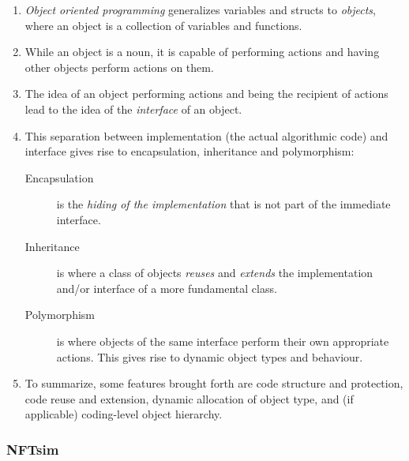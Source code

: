 \documentclass[12pt,a4paper]{article}
\begin{document}
\begin{enumerate}
\item \emph{Object oriented programming} generalizes variables and structs to \emph{objects}, where an object is a collection of variables and functions.

\item While an object is a noun, it is capable of performing actions and having other objects perform actions on them.

\item The idea of an object performing actions and being the recipient of actions lead to the idea of the \emph{interface} of an object.

\item This separation between implementation (the actual algorithmic code) and interface gives rise to encapsulation, inheritance and polymorphism:
    \begin{description}
        \item [Encapsulation] is the \emph{hiding of the implementation} that is not part of the immediate interface.
        \item [Inheritance] is where a class of objects \emph{reuses} and \emph{extends} the implementation and/or interface of a more fundamental class.
        \item [Polymorphism] is where objects of the same interface perform their own appropriate actions. This gives rise to dynamic object types and behaviour.
    \end{description}

\item To summarize, some features brought forth are code structure and protection, code reuse and extension, dynamic allocation of object type, and (if applicable) coding-level object hierarchy.
\end{enumerate}

\subsubsection{NFTsim}
\end{document}
